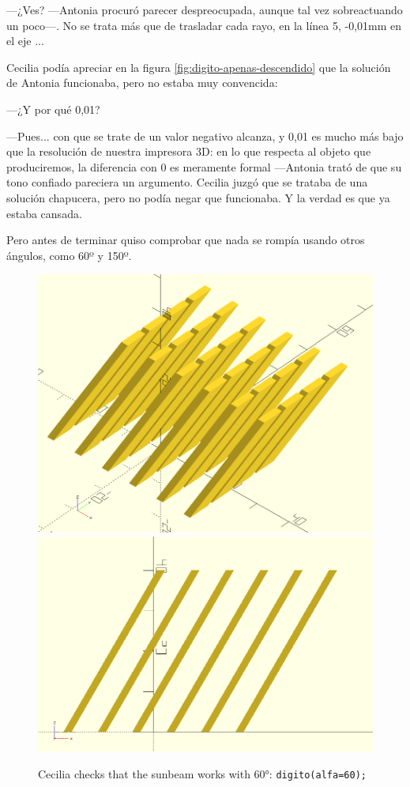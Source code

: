     ---¿Ves? ---Antonia procuró parecer despreocupada, aunque tal vez
    sobreactuando un poco---. No se trata más que de trasladar cada
    rayo, en la línea 5, -0,01mm en el eje ...

    Cecilia podía apreciar en la figura
    \ref{fig:digito-apenas-descendido} que la solución de Antonia
    funcionaba, pero no estaba muy convencida:
    
    ---¿Y por qué 0,01?

    ---Pues... con que se trate de un valor negativo alcanza, y 0,01
    es mucho más bajo que la resolución de nuestra impresora 3D: en lo
    que respecta al objeto que produciremos, la diferencia con 0 es
    meramente formal ---Antonia trató de que su tono confiado
    pareciera un argumento. Cecilia juzgó que se trataba de una
    solución chapucera, pero no podía negar que funcionaba. Y la
    verdad es que ya estaba cansada.
    
    Pero antes de terminar quiso comprobar que nada se rompía usando
    otros ángulos, como 60º y 150º.



  \begin{figure}[ht]
    \centering
  \includegraphics[width=.49\textwidth]{imagenes/matriz-60}\hfill
  \includegraphics[width=.49\textwidth]{imagenes/matriz-60-perfil}
  \caption{Cecilia checks that the sunbeam works with 60\si{\degree}:
\lstinline!digito(alfa=60);!}
    \label{fig:matriz-60}
  \end{figure}
  

